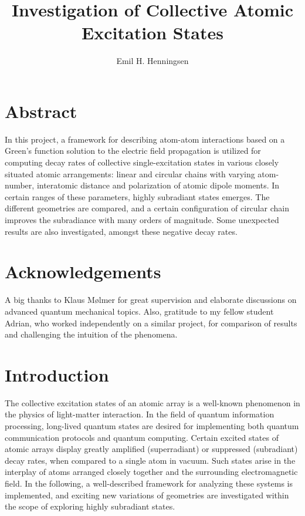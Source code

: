 \documentclass{article}
\author{Emil H. Henningsen}
\title{Investigation of Collective Atomic Excitation States}
\subtitle{}
\institute{Niels Bohr Institute}
\begin{document}
\maketitle

\section*{Abstract}

\noindent
In this project, a framework for describing atom-atom interactions based on a Green's function solution to the electric field propagation is utilized for computing decay rates of collective single-excitation states in various closely situated atomic arrangements: linear and circular chains with varying atom-number, interatomic distance and polarization of atomic dipole moments. In certain ranges of these parameters, highly subradiant states emerges. The different geometries are compared, and a certain configuration of circular chain improves the subradiance with many orders of magnitude. Some unexpected results are also investigated, amongst these negative decay rates. 

\section*{Acknowledgements}
\noindent
A big thanks to Klaus Mølmer for great supervision and elaborate discussions on advanced quantum mechanical topics. Also, gratitude to my fellow student Adrian, who worked independently on a similar project, for comparison of results and challenging the intuition of the phenomena. 

\newpage
\tableofcontents

\section{Introduction}

\noindent
The collective excitation states of an atomic array is a well-known phenomenon in the physics of light-matter interaction. In the field of quantum information processing, long-lived quantum states are desired for implementing both quantum communication protocols and quantum computing. Certain excited states of atomic arrays display greatly amplified (superradiant) or suppressed (subradiant) decay rates, when compared to a single atom in vacuum. Such states arise in the interplay of atoms arranged closely together and the surrounding electromagnetic field. In the following, a well-described framework \cite{Asenjo} for analyzing these systems is implemented, and exciting new variations of geometries are investigated within the scope of exploring highly subradiant states. 
\end{document}
